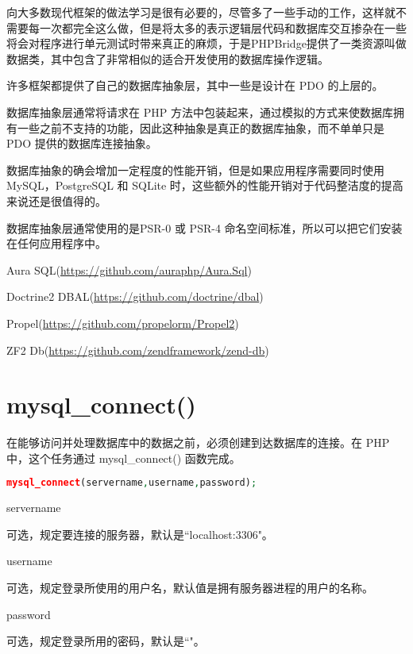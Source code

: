 向大多数现代框架的做法学习是很有必要的，尽管多了一些手动的工作，这样就不需要每一次都完全这么做，但是将太多的表示逻辑层代码和数据库交互掺杂在一些将会对程序进行单元测试时带来真正的麻烦，于是PHPBridge提供了一类资源叫做数据类，其中包含了非常相似的适合开发使用的数据库操作逻辑。

许多框架都提供了自己的数据库抽象层，其中一些是设计在 PDO 的上层的。

数据库抽象层通常将请求在 PHP 方法中包装起来，通过模拟的方式来使数据库拥有一些之前不支持的功能，因此这种抽象是真正的数据库抽象，而不单单只是 PDO 提供的数据库连接抽象。

数据库抽象的确会增加一定程度的性能开销，但是如果应用程序需要同时使用 MySQL，PostgreSQL 和 SQLite 时，这些额外的性能开销对于代码整洁度的提高来说还是很值得的。

数据库抽象层通常使用的是PSR-0 或 PSR-4 命名空间标准，所以可以把它们安装在任何应用程序中。

\begin{compactitem}
\item Aura SQL(\url{https://github.com/auraphp/Aura.Sql})
\item Doctrine2 DBAL(\url{https://github.com/doctrine/dbal})
\item Propel(\url{https://github.com/propelorm/Propel2})
\item ZF2 Db(\url{https://github.com/zendframework/zend-db})
\end{compactitem}








\section{mysql\_connect()}


在能够访问并处理数据库中的数据之前，必须创建到达数据库的连接。在 PHP 中，这个任务通过 mysql\_connect() 函数完成。


\begin{lstlisting}[language=PHP]
mysql_connect(servername,username,password);
\end{lstlisting}

\begin{compactitem}
\item servername

可选，规定要连接的服务器，默认是``localhost:3306"。
\item username

可选，规定登录所使用的用户名，默认值是拥有服务器进程的用户的名称。
\item password

可选，规定登录所用的密码，默认是``"。
\end{compactitem}

